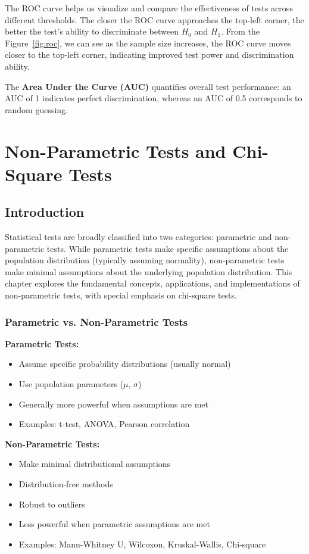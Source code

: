 \documentclass[twoside]{book}
\begin{document}
The ROC curve helps us visualize and compare the effectiveness of tests across different thresholds. The closer the ROC curve approaches the top-left corner, the better the test's ability to discriminate between \(H_0\) and \(H_1\). From the Figure~\ref{fig:roc}, we can see as the sample size increases, the ROC curve moves closer to the top-left corner, indicating improved test power and discrimination ability.

The \textbf{Area Under the Curve (AUC)} quantifies overall test performance: an AUC of 1 indicates perfect discrimination, whereas an AUC of 0.5 corresponds to random guessing.

\chapter{Non-Parametric Tests and Chi-Square Tests}

\section{Introduction}

Statistical tests are broadly classified into two categories: parametric and non-parametric tests. While parametric tests make specific assumptions about the population distribution (typically assuming normality), non-parametric tests make minimal assumptions about the underlying population distribution. This chapter explores the fundamental concepts, applications, and implementations of non-parametric tests, with special emphasis on chi-square tests.

\subsection{Parametric vs. Non-Parametric Tests}

\textbf{Parametric Tests:}
\begin{itemize}
    \item Assume specific probability distributions (usually normal)
    \item Use population parameters ($\mu$, $\sigma$)
    \item Generally more powerful when assumptions are met
    \item Examples: t-test, ANOVA, Pearson correlation
\end{itemize}

\textbf{Non-Parametric Tests:}
\begin{itemize}
    \item Make minimal distributional assumptions
    \item Distribution-free methods
    \item Robust to outliers
    \item Less powerful when parametric assumptions are met
    \item Examples: Mann-Whitney U, Wilcoxon, Kruskal-Wallis, Chi-square
\end{itemize}
\end{document}
